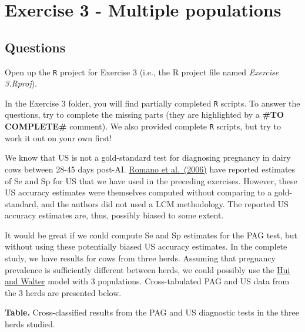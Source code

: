 \documentclass[
]{book}
\begin{document}
\chapter{Exercise 3 - Multiple populations}\label{exercise-3---multiple-populations}

\section{Questions}\label{questions-2}

Open up the \texttt{R} project for Exercise 3 (i.e., the R project file named \emph{Exercise 3.Rproj}).

In the Exercise 3 folder, you will find partially completed \texttt{R} scripts. To answer the questions, try to complete the missing parts (they are highlighted by a \textbf{\#TO COMPLETE\#} comment). We also provided complete \texttt{R} scripts, but try to work it out on your own first!

We know that US is not a gold-standard test for diagnosing pregnancy in dairy cows between 28-45 days post-AI. \href{https://www.sciencedirect.com/science/article/pii/S0093691X06001543?via\%3Dihub}{Romano et al.~(2006)} have reported estimates of Se and Sp for US that we have used in the preceding exercises. However, these US accuracy
estimates were themselves computed without comparing to a gold-standard, and the authors did not used a LCM methodology. The reported US accuracy estimates are, thus, possibly biased to some extent.

It would be great if we could compute Se and Sp estimates for the PAG test, but without using these potentially biased US accuracy estimates. In the complete study, we have results for cows from three herds. Assuming that pregnancy prevalence is sufficiently different between herds, we could possibly use the \href{https://www.jstor.org/stable/2530508?seq=1}{Hui and Walter} model with 3 populations. Cross-tabulated PAG and US data from the 3 herds are presented below.

\textbf{Table.} Cross-classified results from the PAG and US diagnostic tests in the three herds studied.
\end{document}
